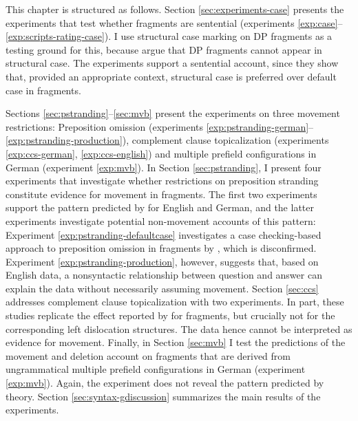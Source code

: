 This chapter is structured as follows. Section \ref{sec:experiments-case} presents the experiments that test whether fragments are sentential (experiments \ref{exp:case}--\ref{exp:scripts-rating-case}). I use structural case marking on DP fragments as a testing ground for this, because \citet{barton.progovac2005} argue that DP fragments cannot appear in structural case. The experiments support a sentential account, since they show that, provided an appropriate context, structural case is preferred over default case in fragments.

Sections \ref{sec:pstranding}--\ref{sec:mvb} present the experiments on three movement restrictions: Pre\-position omission (experiments \ref{exp:pstranding-german}--\ref{exp:pstranding-production}), complement clause topicalization (experiments \ref{exp:ccs-german}, \ref{exp:ccs-english}) and multiple prefield configurations in German (experiment \ref{exp:mvb}). In Section \ref{sec:pstranding}, I present four experiments that investigate whether restrictions on preposition stranding constitute evidence for movement in fragments. The first two experiments support the pattern predicted by \citet{merchant2004} for English and German, and the latter experiments investigate potential non-movement accounts of this pattern: Experiment \ref{exp:pstranding-defaultcase} investigates a case checking-based approach to preposition omission in fragments by \citet{progovac.etal2006}, which is disconfirmed. Experiment \ref{exp:pstranding-production}, however, suggests that, based on English data, a nonsyntactic relationship between question and answer can explain the data without necessarily assuming movement. Section \ref{sec:ccs} addresses complement clause topicalization with two experiments. In part, these studies replicate the effect reported by \citet{merchant.etal2013} for fragments, but crucially not for the corresponding left dislocation structures. The data hence cannot be interpreted as evidence for movement. Finally, in Section \ref{sec:mvb} I test the predictions of the movement and deletion account on fragments that are derived from ungrammatical multiple prefield configurations in German (experiment \ref{exp:mvb}). Again, the experiment does not reveal the pattern predicted by  theory. Section \ref{sec:syntax-gdiscussion} summarizes the main results of the experiments. 

